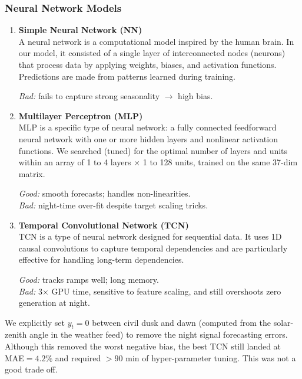 \subsubsection*{Neural Network Models}
\begin{enumerate}
  \item \textbf{Simple Neural Network (NN)}\\
        A neural network is a computational model inspired by the human brain. 
        In our model, it consisted of a single layer of interconnected nodes (neurons) 
        that process data by applying weights, biases, and activation functions.
        Predictions are made from patterns learned during training.

        \emph{Bad:} fails to capture strong seasonality $\rightarrow$ high bias.
  \item \textbf{Multilayer Perceptron (MLP)}\\
        MLP is a specific type of neural network: a fully connected feedforward neural 
        network with one or more hidden layers and nonlinear activation functions.
        We searched (tuned) for the optimal number of layers and units within an array of 1 
        to 4 layers $\times$ 1 to 128 units, trained on the same 37-dim matrix.

        \emph{Good:} smooth forecasts; handles non-linearities.\\
        \emph{Bad:} night-time over-fit despite target scaling tricks.
  \item \textbf{Temporal Convolutional Network (TCN)}\\
        TCN is a type of neural network designed for sequential data. It uses 1D causal 
        convolutions to capture temporal dependencies and are particularly effective for 
        handling long-term dependencies.

        \emph{Good:} tracks ramps well; long memory.\\
        \emph{Bad:} 3× GPU time, sensitive to feature scaling, and still
        overshoots zero generation at night.
\end{enumerate}


We explicitly set $y_t=0$ between civil dusk and dawn (computed from the
solar-zenith angle in the weather feed) to remove the night signal forecasting errors.
Although this removed the worst negative bias, the best TCN still landed at \textrm{MAE}$=4.2\%$ and required
$>\!90$ min of hyper-parameter tuning. This was not a good trade off.

